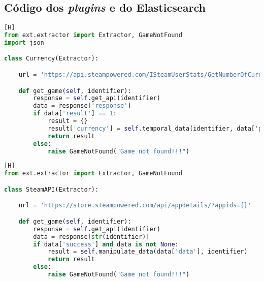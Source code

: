 \begin{anexosenv}

\partanexos

\chapter{Código dos \textit{plugins} e do Elasticsearch}
\label{anexo:codes}
\begin{lstlisting}[language={Python}, caption = {Código do \textit{plugin} \textit{\textbf{Steam Currency}}}] [H]
from ext.extractor import Extractor, GameNotFound
import json

class Currency(Extractor):

	url = 'https://api.steampowered.com/ISteamUserStats/GetNumberOfCurrentPlayers/v1/?appid={}'	

	def get_game(self, identifier):
		response = self.get_api(identifier)
		data = response['response']
		if data['result'] == 1:
			result = {}
			result['currency'] = self.temporal_data(identifier, data['player_count'], 'currency')
			return result
		else:
			raise GameNotFound("Game not found!!!")
\end{lstlisting}
\begin{lstlisting}[language={Python}, caption = {Código do \textit{plugin} \textit{\textbf{Steam Store API}}}] [H]
from ext.extractor import Extractor, GameNotFound

class SteamAPI(Extractor):

	url = 'https://store.steampowered.com/api/appdetails/?appids={}'

	def get_game(self, identifier):
		response = self.get_api(identifier)
		data = response[str(identifier)]
		if data['success'] and data is not None:
			result = self.manipulate_data(data['data'], identifier)
			return result
		else:
			raise GameNotFound("Game not found!!!")


\end{lstlisting}
\end{anexosenv}
